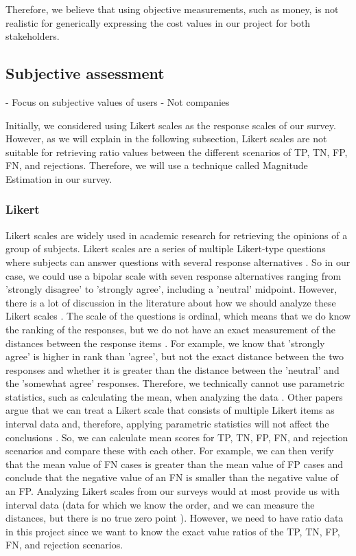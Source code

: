 Therefore, we believe that using objective measurements, such as money, is not realistic for generically expressing the cost values in our project for both stakeholders.

\subsection{Subjective assessment}
- Focus on subjective values of users
- Not companies

Initially, we considered using Likert scales as the response scales of our survey. However, as we will explain in the following subsection, Likert scales are not suitable for retrieving ratio values between the different scenarios of TP, TN, FP, FN, and rejections. Therefore, we will use a technique called Magnitude Estimation in our survey.

\subsubsection{Likert}
\label{sec:likert}
Likert scales are widely used in academic research for retrieving the opinions of a group of subjects. Likert scales are a series of multiple Likert-type questions where subjects can answer questions with several response alternatives \cite{boone2012analyzing}. So in our case, we could use a bipolar scale with seven response alternatives ranging from 'strongly disagree' to 'strongly agree', including a 'neutral' midpoint. However, there is a lot of discussion in the literature about how we should analyze these Likert scales \cite{boone2012analyzing, allen2007likert, norman2010likert, murray2013likert}. The scale of the questions is ordinal, which means that we do know the ranking of the responses, but we do not have an exact measurement of the distances between the response items \cite{allen2007likert}. For example, we know that 'strongly agree' is higher in rank than 'agree', but not the exact distance between the two responses and whether it is greater than the distance between the 'neutral' and the 'somewhat agree' responses. Therefore, we technically cannot use parametric statistics, such as calculating the mean, when analyzing the data \cite{allen2007likert}. Other papers argue that we can treat a Likert scale that consists of multiple Likert items as interval data and, therefore, applying parametric statistics will not affect the conclusions \cite{boone2012analyzing, norman2010likert, murray2013likert}. So, we can calculate mean scores for TP, TN, FP, FN, and rejection scenarios and compare these with each other. For example, we can then verify that the mean value of FN cases is greater than the mean value of FP cases and conclude that the negative value of an FN is smaller than the negative value of an FP. Analyzing Likert scales from our surveys would at most provide us with interval data (data for which we know the order, and we can measure the distances, but there is no true zero point \cite{allen2007likert}). However, we need to have ratio data in this project since we want to know the exact value ratios of the TP, TN, FP, FN, and rejection scenarios.

